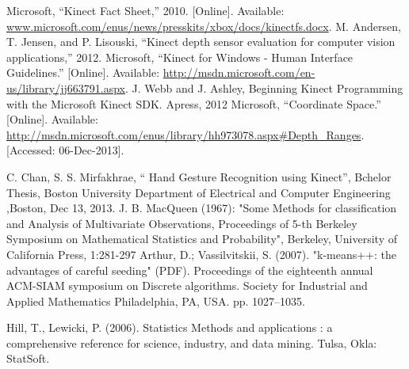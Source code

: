 \documentclass{report}           %
\begin{document}
\begin{thebibliography}{80}
 Microsoft, “Kinect Fact Sheet,” 2010. [Online]. Available: \url{www.microsoft.com/enus/news/presskits/xbox/docs/kinectfs.docx}.
M. Andersen, T. Jensen, and P. Lisouski, “Kinect depth sensor evaluation for computer
vision applications,” 2012.
Microsoft, “Kinect for Windows - Human Interface Guidelines.” [Online]. Available:
\url{http://msdn.microsoft.com/en-us/library/jj663791.aspx}.
J. Webb and J. Ashley, Beginning Kinect Programming with the Microsoft Kinect SDK.
Apress, 2012
Microsoft, “Coordinate Space.” [Online]. Available: \url{http://msdn.microsoft.com/enus/library/hh973078.aspx#Depth\_Ranges}.
[Accessed: 06-Dec-2013].

C. Chan, S. S. Mirfakhrae, “ Hand Gesture Recognition using
Kinect”, Bchelor Thesis, Boston University Department of
Electrical and Computer Engineering ,Boston, Dec 13, 2013.
J. B. MacQueen (1967): "Some Methods for classification and Analysis of Multivariate Observations, Proceedings of 5-th Berkeley Symposium on Mathematical Statistics and Probability", Berkeley, University of California Press, 1:281-297
Arthur, D.; Vassilvitskii, S. (2007). "k-means++: the advantages of careful seeding" (PDF). Proceedings of the eighteenth annual ACM-SIAM symposium on Discrete algorithms. Society for Industrial and Applied Mathematics Philadelphia, PA, USA. pp. 1027–1035.

Hill, T.,  Lewicki, P. (2006). Statistics Methods and applications : a comprehensive reference for science, industry, and data mining. Tulsa, Okla: StatSoft.


\end{thebibliography}
\end{document}
